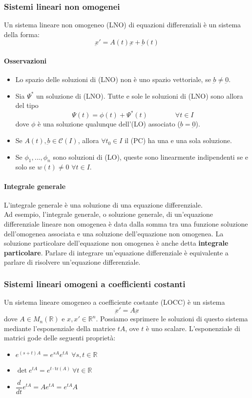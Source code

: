 \documentclass[a4paper,12pt]{article}
\newcommand{\cont}{\mathscr{C}}
\begin{document}
\subsubsection{Sistemi lineari non omogenei}
Un sistema lineare non omogeneo (LNO) di equazioni differenziali è un sistema della forma:
$$\underbar{x}' = A(t)\underbar{x} + \underbar{b}(t)$$
\paragraph{Osservazioni}
\begin{itemize}
 \item Lo spazio delle soluzioni di (LNO) non è uno spazio vettoriale, se $\underbar{b}\neq\underbar{0}$.
 \item Sia $\Psi^*$ un soluzione di (LNO). Tutte e sole le soluzioni di (LNO) sono allora del tipo
       $$ \Psi(t) = \phi(t) + \Psi^*(t)\qquad \qquad \forall t \in I$$
       dove $\phi$ è una soluzione qualunque dell'(LO) associato ($\underbar{b}=\underbar{0}$).
 \item Se $A(t) , \underbar{b}\in \cont(I)$, allora $ \forall t_0 \in I$ il (PC)  ha una e una sola soluzione.
 \item Se $\phi_1,...,\phi_n$ sono soluzioni di (LO), queste sono linearmente indipendenti se e solo se $w(t)\neq0$ $\forall t \in I$.
\end{itemize}


\paragraph{Integrale generale}
L'integrale generale è una soluzione di una equazione differenziale.\\
Ad esempio, l'integrale generale, o soluzione generale, di un'equazione differenziale lineare non omogenea è data dalla somma tra una funzione soluzione dell'omogenea associata e una soluzione dell'equazione non omogenea. La soluzione particolare dell'equazione non omogenea è anche detta \textbf{integrale particolare}. Parlare di integrare un'equazione differenziale è equivalente a parlare di risolvere un'equazione differenziale.

\subsubsection{Sistemi lineari omogeni a coefficienti costanti}
Un sistema lineare omogeneo a coefficiente costante (LOCC) è un sistema
$$\underbar{x}' = A\underbar{x}$$
dove $A \in M_n(\mathbb{R})$ e $x,x'\in\mathbb{R}^n$. Possiamo esprimere le soluzioni di questo sistema mediante l'esponenziale della matrice $tA$, ove $t$ è uno scalare.
L'esponenziale di matrici gode delle seguenti proprietà:
\begin{itemize}
\item $e^{(s+t)A} = e^{sA}e^{tA} \ \ \forall s,t \in \mathbb{R} $
\item $\det e^{tA}=e^{t\cdot\text{tr}(A)} \ \forall t \in \mathbb{R} $
\item $\dfrac{d}{dt} e^{tA} = A e^{tA} = e^{tA}A$
\end{itemize}
\end{document}
